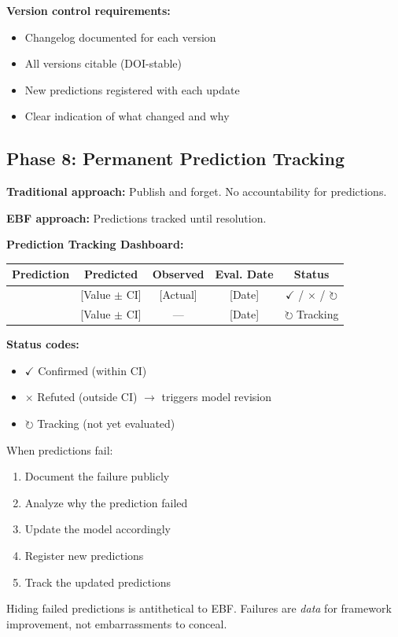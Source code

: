 \textbf{Version control requirements:}
\begin{itemize}[nosep]
    \item Changelog documented for each version
    \item All versions citable (DOI-stable)
    \item New predictions registered with each update
    \item Clear indication of what changed and why
\end{itemize}

\subsection{Phase 8: Permanent Prediction Tracking}

\textbf{Traditional approach:} Publish and forget. No accountability for predictions.

\textbf{EBF approach:} Predictions tracked until resolution.

\textbf{Prediction Tracking Dashboard:}
\begin{center}
\small
\begin{tabular}{@{}lcccc@{}}
\toprule
\textbf{Prediction} & \textbf{Predicted} & \textbf{Observed} & \textbf{Eval. Date} & \textbf{Status} \\
\midrule
[Prediction 1] & [Value $\pm$ CI] & [Actual] & [Date] & $\checkmark$ / $\times$ / $\circlearrowright$ \\
[Prediction 2] & [Value $\pm$ CI] & --- & [Date] & $\circlearrowright$ Tracking \\
\bottomrule
\end{tabular}
\end{center}

\textbf{Status codes:}
\begin{itemize}[nosep]
    \item $\checkmark$ Confirmed (within CI)
    \item $\times$ Refuted (outside CI) $\to$ triggers model revision
    \item $\circlearrowright$ Tracking (not yet evaluated)
\end{itemize}

\begin{tcolorbox}[colback=red!5!white, colframe=red!75!black,
    title=\textbf{Critical Principle: Refutation $\to$ Revision, Not Concealment}]

When predictions fail:
\begin{enumerate}[nosep]
    \item Document the failure publicly
    \item Analyze why the prediction failed
    \item Update the model accordingly
    \item Register new predictions
    \item Track the updated predictions
\end{enumerate}

Hiding failed predictions is antithetical to EBF. Failures are \textit{data}
for framework improvement, not embarrassments to conceal.

\end{tcolorbox}



